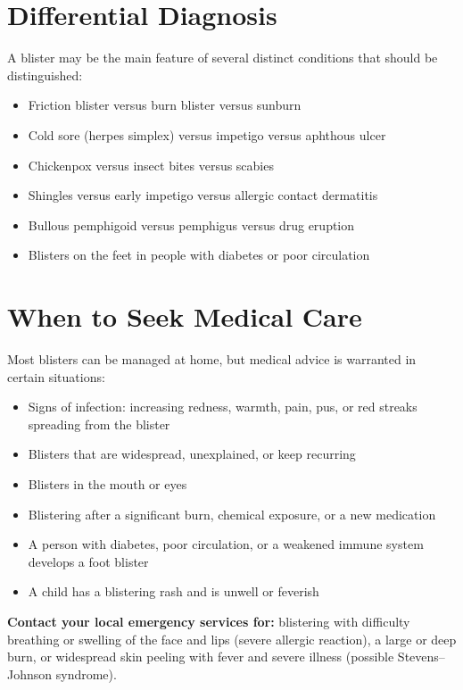 \section*{Differential Diagnosis}
A blister may be the main feature of several distinct conditions that should be distinguished:

\begin{itemize}
    \item Friction blister versus burn blister versus sunburn
    \item Cold sore (herpes simplex) versus impetigo versus aphthous ulcer
    \item Chickenpox versus insect bites versus scabies
    \item Shingles versus early impetigo versus allergic contact dermatitis
    \item Bullous pemphigoid versus pemphigus versus drug eruption
    \item Blisters on the feet in people with diabetes or poor circulation
\end{itemize}

\section*{When to Seek Medical Care}
Most blisters can be managed at home, but medical advice is warranted in certain situations:

\begin{itemize}
    \item Signs of infection: increasing redness, warmth, pain, pus, or red streaks spreading from the blister
    \item Blisters that are widespread, unexplained, or keep recurring
    \item Blisters in the mouth or eyes
    \item Blistering after a significant burn, chemical exposure, or a new medication
    \item A person with diabetes, poor circulation, or a weakened immune system develops a foot blister
    \item A child has a blistering rash and is unwell or feverish
\end{itemize}

\textbf{Contact your local emergency services for:} blistering with difficulty breathing or swelling of the face and lips (severe allergic reaction), a large or deep burn, or widespread skin peeling with fever and severe illness (possible Stevens--Johnson syndrome).

